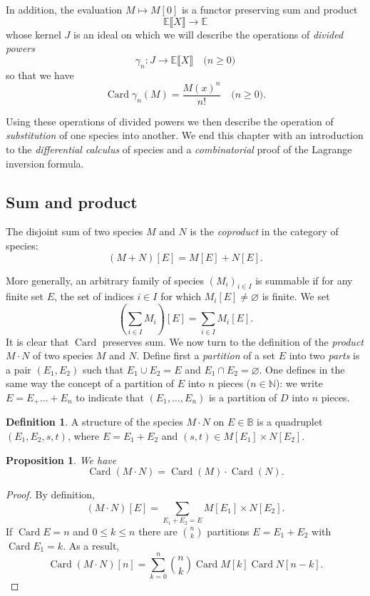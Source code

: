 \documentclass{amsart}
\newtheorem{prop}[thm]{Proposition}
\theoremstyle{definition}
\newtheorem{defn}[thm]{Definition}
\theoremstyle{remark}
\newcommand{\B}{\mathbb{B}}
\newcommand{\E}{\mathbb{E}}
\newcommand{\N}{\mathbb{N}}
\DeclareMathOperator{\Card}{Card}
\newcommand{\Poly}[2]{#1 \llbracket #2 \rrbracket}
\newcommand{\term}[1]{\emph{#1}}
\newcommand{\union}{\cup}
\newcommand{\intersect}{\cap}
\begin{document}
In addition, the evaluation $M \mapsto M [0]$ is a functor preserving sum and
product
\[ \Poly \E X \to \E \]
whose kernel $J$ is an ideal on which we will describe the operations
of \term{divided powers} \citep{cartan1954seminaire}
\[ \gamma_n : J \to \Poly \E X \quad \text{($n \geq 0$)} \]
so that we have
\[ \Card \gamma_n(M) = \frac{M(x)^n}{n!} \quad \text{($n \geq 0$)}. \]

Using these operations of divided powers we then describe
the operation of \term{substitution} of one species into another. We end this
chapter with an introduction to the \term{differential calculus} of species
and a \emph{combinatorial} proof of the Lagrange inversion formula.

\subsection{Sum and product}

The disjoint sum of two species $M$ and $N$ is the \emph{coproduct}
in the category of species:
\[ (M + N) [E] = M [E] + N [E]. \]

More generally, an arbitrary family of species $(M_i)_{i \in I}$ is
summable if for any finite set $E$, the set of indices $i \in I$ for
which $M_i[E] \neq \varnothing$ is finite.  We set
\[ \left( \sum_{i \in I} M_i \right) [ E ] = \sum_{i \in I} M_i[E]. \]
It is clear that $\Card$ preserves sum. We now turn to the definition
of the \term{product} $M \cdot N$ of two species $M$ and $N$. Define
first a \term{partition} of a set $E$ into two \term{parts} is a pair
$(E_1, E_2)$ such that $E_1 \union E_2 = E$ and $E_1 \intersect E_2 =
\varnothing$. One defines in the same way the concept of a partition
of $E$ into $n$ pieces ($n \in \N$): we write $E = E_ + \dots + E_n$
to indicate that $(E_1, \dots, E_n)$ is a partition of $D$ into $n$
pieces.

\begin{defn}
  A structure of the species $M \cdot N$ on $E \in \B$ is a quadruplet
  $(E_1, E_2, s, t)$, where $E = E_1 + E_2$ and $(s, t) \in M[E_1]
  \times N [E_2]$.
\end{defn}

\begin{prop}
We have
\[ \Card (M \cdot N) = \Card (M) \cdot \Card (N). \]
\end{prop}
\begin{proof}
By definition,
\[ (M \cdot N)[E] = \sum_{E_1 + E_2 = E} M[E_1] \times N[E_2]. \]
If $\Card E = n$ and $0 \leq k \leq n$ there are $\binom n k$
partitions $E = E_1 + E_2$ with $\Card E_1 = k$.  As a result,
\[ \Card(M \cdot N) [n] = \sum_{k=0}^n \binom n k \Card M [k] \Card N
[n - k]. \]
\end{proof}
\end{document}
